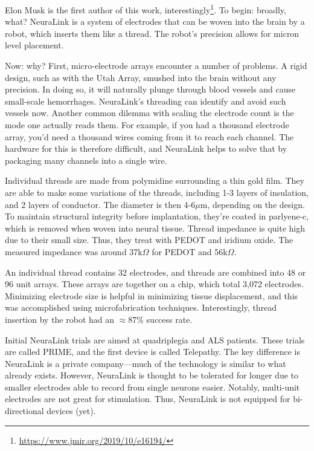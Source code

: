 Elon Musk is the first author of this work, interestingly\footnote{\url{https://www.jmir.org/2019/10/e16194/}}. To begin: broadly, what? NeuraLink is a system of electrodes that can be woven into the brain by a robot, which inserts them like a thread. The robot's precision allows for micron level placement. \newline

Now: why? First, micro-electrode arrays encounter a number of problems. A rigid design, such as with the Utah Array, smushed into the brain without any precision. In doing so, it will naturally plunge through blood vessels and cause small-scale hemorrhages. NeuraLink's threading can identify and avoid such vessels now. Another common dilemma with scaling the electrode count is the mode one actually reads them. For example, if you had a thousand electrode array, you'd need a thousand wires coming from it to reach each channel. The hardware for this is therefore difficult, and NeuraLink helps to solve that by packaging many channels into a single wire. \newline

Individual threads are made from polymidine surrounding a thin gold film. They are able to make some variations of the threads, including 1-3 layers of insulation, and 2 layers of conductor. The diameter is then 4-6$\mu$m, depending on the design. To maintain structural integrity before implantation, they're coated in parlyene-c, which is removed when woven into neural tissue. Thread impedance is quite high due to their small size. Thus, they treat with PEDOT and iridium oxide. The measured impedance was around 37k$\Omega$ for PEDOT and 56k$\Omega$. \newline

An individual thread contains 32 electrodes, and threads are combined into 48 or 96 unit arrays. These arrays are together on a chip, which total 3,072 electrodes. Minimizing electrode size is helpful in minimizing tissue displacement, and this was accomplished using microfabrication techniques. Interestingly, thread insertion by the robot had an $\approx$87\% success rate. \newline

Initial NeuraLink trials are aimed at quadriplegia and ALS patients. These trials are called PRIME, and the first device is called Telepathy. The key difference is NeuraLink is a private company---much of the technology is similar to what already exists. However, NeuraLink is thought to be tolerated for longer due to smaller electrodes able to record from single neurons easier. Notably, multi-unit electrodes are not great for stimulation. Thus, NeuraLink is not equipped for bi-directional devices (yet). 




